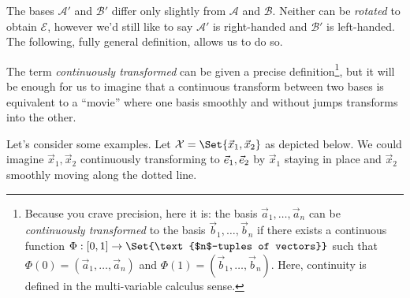 The bases $\mathcal A'$ and $\mathcal B'$ differ only slightly from $\mathcal A$ and $\mathcal B$. Neither can
be \emph{rotated} to obtain $\mathcal E$, however we'd still like to say $\mathcal A'$ is right-handed and
$\mathcal B'$ is left-handed. The following, fully general definition, allows us to do so.


The term \emph{continuously transformed} can be given a precise definition\footnote{ Because you crave precision, here it is:
the basis $\vec a_1,\ldots, \vec a_n$ can be \emph{continuously transformed} to the basis $\vec b_1,\ldots,\vec b_n$ if there
exists a continuous function $\Phi:[0,1]\to\Set{\text{$n$-tuples of vectors}}$ such that $\Phi(0)=(\vec a_1,\ldots,\vec a_n)$
and $\Phi(1)=(\vec b_1,\ldots,\vec b_n)$. Here, continuity is defined in the multi-variable calculus sense.
}, but it will be enough for us
to imagine that  a continuous transform between two bases is equivalent to a ``movie'' where one
basis smoothly and without jumps transforms into the other.

Let's consider some examples. Let $\mathcal X=\Set{\vec x_1,\vec x_2}$ as depicted below. We could imagine $\vec x_1,\vec x_2$ continuously 
transforming to ${\vec e_1}, {\vec e_2}$ by $\vec x_1$ staying in place and $\vec x_2$ smoothly moving along the dotted
line.

